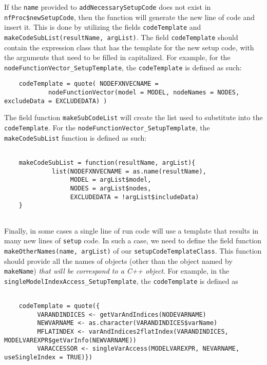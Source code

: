 \documentclass[11pt]{article}
\numberwithin{equation}{section}
\begin{document}
	If the \texttt{name} provided to \texttt{addNecessarySetupCode} does not exist in \texttt{nfProc\$newSetupCode}, then the function will generate the new line of code and insert it. This is done by utilizing the fields \texttt{codeTemplate} and \texttt{makeCodeSubList(resultName, argList)}. The field \texttt{codeTemplate} should contain the expression class that has the template for the new setup code, with the arguments that need to be filled in capitalized. For example, for the \texttt{nodeFunctionVector\_SetupTemplate}, the \texttt{codeTemplate} is defined as such:
	
	\begin{verbatim}
	codeTemplate = quote( NODEFXNVECNAME = 
		   	nodeFunctionVector(model = MODEL, nodeNames = NODES, excludeData = EXCLUDEDATA) ) 
	\end{verbatim}
	
	The field function \texttt{makeSubCodeList} will create the list used to substitute into the \texttt{codeTemplate}. For the \texttt{nodeFunctionVector\_SetupTemplate}, the \texttt{makeCodeSubList} function is defined as such:
	
	\begin{verbatim}
	
	makeCodeSubList = function(resultName, argList){
	         list(NODEFXNVECNAME = as.name(resultName),
	              MODEL = argList$model,
	              NODES = argList$nodes,
	              EXCLUDEDATA = !argList$includeData)
	}
	
	\end{verbatim}
	
	Finally, in some cases a single line of run code will use a template that results in many new lines of \texttt{setup} code. In such a case, we need to define the field function \texttt{makeOtherNames(name, argList)} of our \texttt{setupCodeTemplateClass}. This function should provide all the names of objects (other than the object named by \texttt{makeName}) \emph{that will be correspond to a C++ object}. For example, in the \texttt{singleModelIndexAccess\_SetupTemplate}, the \texttt{codeTemplate} is defined as 
	
	\begin{verbatim}
	
	codeTemplate = quote({
	     VARANDINDICES <- getVarAndIndices(NODEVARNAME)
	     NEWVARNAME <- as.character(VARANDINDICES$varName)
	     MFLATINDEX <- varAndIndices2flatIndex(VARANDINDICES, MODELVAREXPR$getVarInfo(NEWVARNAME))
	     VARACCESSOR <- singleVarAccess(MODELVAREXPR, NEVARNAME, useSingleIndex = TRUE)})
	
	\end{verbatim}
	
\end{document}
